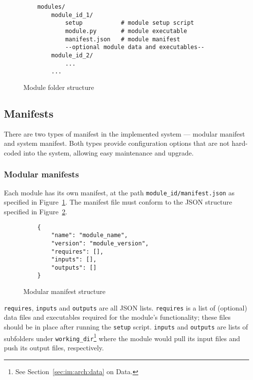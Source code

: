 \begin{figure}[ht]
\begin{lstlisting}
    modules/
        module_id_1/
            setup           # module setup script
            module.py       # module executable
            manifest.json   # module manifest
            --optional module data and executables--
        module_id_2/
            ...
        ...            
\end{lstlisting}
\caption{Module folder structure}\label{module}
\end{figure}

\subsection{Manifests}\label{sec:im:arch:man}

There are two types of manifest in the implemented system --- modular manifest
and system manifest. Both types provide configuration options that are not
hard-coded into the system, allowing easy maintenance and upgrade.

\subsubsection{Modular manifests}

Each module has its own manifest, at the path \texttt{module\_id/manifest.json}
as specified in Figure~\ref{module}. The manifest file must conform to the
JSON structure specified in Figure~\ref{manifest-md}.

\begin{figure}[ht]
\begin{lstlisting}
    {
        "name": "module_name",
        "version": "module_version",
        "requires": [],
        "inputs": [],
        "outputs": []
    }
\end{lstlisting}
\caption{Modular manifest structure}\label{manifest-md}
\end{figure}

\texttt{requires}, \texttt{inputs} and \texttt{outputs} are all JSON lists.
\texttt{requires} is a list of (optional) data files and executables required
for the module's functionality; these files should be in place after running
the \texttt{setup} script. \texttt{inputs} and \texttt{outputs} are lists of
subfolders under \texttt{working\_dir}\footnote{See Section~\ref{sec:im:arch:data}
on Data.} where the module would pull its input files and push its output
files, respectively.

